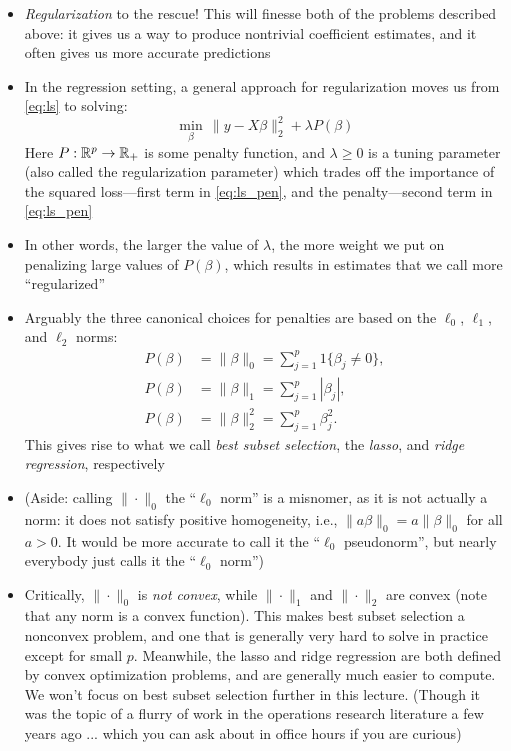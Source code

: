 \documentclass{article}
\begin{document}
\begin{itemize}
\item \emph{Regularization} to the rescue! This will finesse both of the
  problems described above: it gives us a way to produce nontrivial coefficient 
  estimates, and it often gives us more accurate predictions 

\item In the regression setting, a general approach for regularization moves us 
  from \eqref{eq:ls} to solving:
  \begin{equation}
  \label{eq:ls_pen}
  \min_\beta \, \|y - X\beta\|_2^2 + \lambda P(\beta)
  \end{equation}
  Here $P : \mathbb{R}^p \to \mathbb{R}_+$ is some penalty function, and $\lambda \geq 0$ is a
  tuning parameter (also called the regularization parameter) which trades off
  the importance of the squared loss---first term in \eqref{eq:ls_pen}, and the
  penalty---second term in \eqref{eq:ls_pen}  

\item In other words, the larger the value of $\lambda$, the more weight we put
  on penalizing large values of $P(\beta)$, which results in estimates that we
  call more ``regularized''   

\item Arguably the three canonical choices for penalties are based on the
  $\ell_0$, $\ell_1$, and $\ell_2$ norms:   
  \begin{align*}
  P(\beta) &= \|\beta\|_0 = \sum_{j=1}^p 1\{\beta_j \not= 0\}, \\
  P(\beta) &= \|\beta\|_1 = \sum_{j=1}^p |\beta_j|, \\
  P(\beta) &= \|\beta\|_2^2 = \sum_{j=1}^p \beta_j^2.
  \end{align*}
  This gives rise to what we call \emph{best subset selection}, the
  \emph{lasso}, and \emph{ridge regression}, respectively

\item (Aside: calling $\|\cdot\|_0$ the ``$\ell_0$ norm'' is a misnomer, as it
  is not actually a norm: it does not satisfy positive homogeneity, i.e.,
  $\|a\beta\|_0 = a\|\beta\|_0$ for all $a>0$. It would be more accurate to
  call it the ``$\ell_0$ pseudonorm'', but nearly everybody just calls it the
  ``$\ell_0$ norm'')

\item Critically, $\|\cdot\|_0$ is \emph{not convex}, while $\|\cdot\|_1$ and 
  $\|\cdot\|_2$ are convex (note that any norm is a convex function). This makes
  best subset selection a nonconvex problem, and one that is generally very hard
  to solve in practice except for small $p$. Meanwhile, the lasso and ridge
  regression are both defined by convex optimization problems, and are generally
  much easier to compute. We won't focus on best subset selection further in
  this lecture. (Though it was the topic of a flurry of work in the operations
  research literature a few years ago ... which you can ask about in office
  hours if you are curious)   


\end{itemize}
\end{document}
